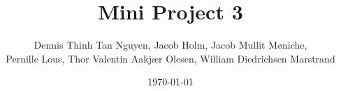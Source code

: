 \documentclass{article}
\author{Dennis Thinh Tan Nguyen, Jacob Holm, Jacob Mullit Møniche,\\
		 Pernille Lous, Thor Valentin Aakjær Olesen, William Diedrichsen Marstrand}
\date{\today}
\title{Mini Project 3}
\begin{document}
\maketitle
\pagebreak








\end{document}
